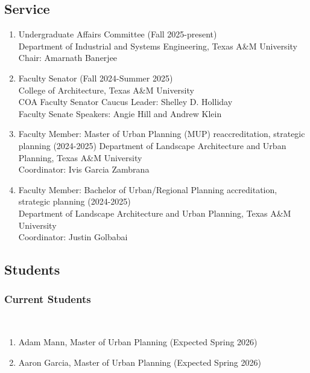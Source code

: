 \documentclass[11pt,oneside]{article}
\begin{document}
\subsection{Service}
\begin{enumerate}[leftmargin=40pt]
\item {Undergraduate Affairs Committee (Fall 2025-present)}\\
      {Department of Industrial and Systems Engineering, Texas A\&M University}\\
      Chair: Amarnath Banerjee
\item Faculty Senator (Fall 2024-Summer 2025)\\
      {College of Architecture, Texas A\&M University}\\
      COA Faculty Senator Caucus Leader: Shelley D. Holliday\\
      Faculty Senate Speakers: Angie Hill and Andrew Klein
\item Faculty Member: Master of Urban Planning (MUP) reaccreditation, strategic planning (2024-2025)
      {Department of Landscape Architecture and Urban Planning, Texas A\&M University}\\
      Coordinator: Ivis Garcia Zambrana
\item Faculty Member: Bachelor of Urban/Regional Planning accreditation, strategic planning (2024-2025)\\
      {Department of Landscape Architecture and Urban Planning, Texas A\&M University}\\
      Coordinator: Justin Golbabai
\end{enumerate}

\subsection{Students}
\subsubsection{Current Students}
\hspace{40pt}{\frutigerregular External Committee Member}\\
\begin{enumerate}[leftmargin=40pt]
\item Adam Mann, Master of Urban Planning (Expected Spring 2026)
\item Aaron Garcia, Master of Urban Planning (Expected Spring 2026)
\end{enumerate}
\end{document}
